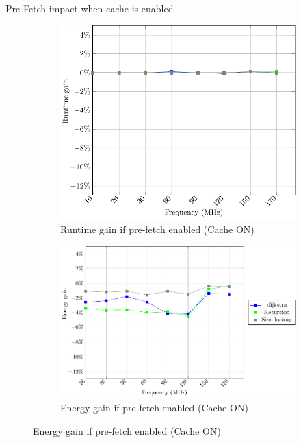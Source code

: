 \documentclass[
	11pt, %
]{beamer}
\begin{document}
\begin{frame}{Pre-Fetch impact when cache is enabled}
	\begin{figure}
		\begin{subfigure}{0.4\textwidth}
			\includegraphics[scale = 0.4]{data/stm32g_v2/pre_fetch_impact_cache_on/duration.pdf}
			\caption{Runtime gain if pre-fetch enabled (Cache ON)}
		\end{subfigure}
		\begin{subfigure}{0.4\textwidth}
			\includegraphics[scale = 0.4]{data/stm32g_v2/pre_fetch_impact_cache_on/energy.pdf}
			\caption{Energy gain if pre-fetch enabled (Cache ON)}
		\end{subfigure}

	\end{figure}
\end{frame}
\end{document}
